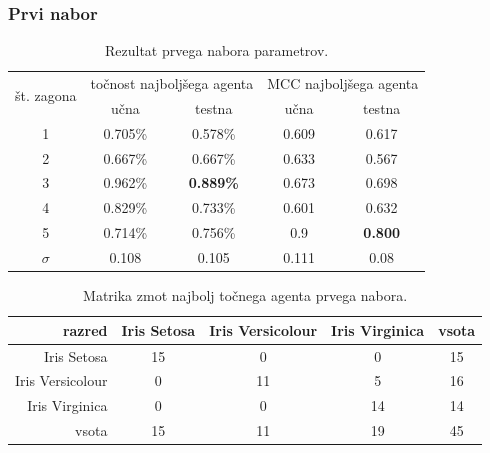 \subsubsection{Prvi nabor}
\begin{table}[H]
    \caption{Rezultat prvega nabora parametrov.}
    \begin{center}
        \begin{tabular}{|| c | c c || c c ||}
            \hline
            \multirow{2}{*}{št. zagona} & \multicolumn{2}{c||}{točnost najboljšega agenta} & \multicolumn{2}{c||}{MCC najboljšega agenta} \\ \cline{2-5}
            & učna    & testna           & učna  & testna         \\
            \hline
            1        & 0.705\% & 0.578\%          & 0.609 & 0.617          \\
            \hline
            2        & 0.667\% & 0.667\%          & 0.633 & 0.567          \\
            \hline
            3        & 0.962\% & \textbf{0.889\%} & 0.673 & 0.698          \\
            \hline
            4        & 0.829\% & 0.733\%          & 0.601 & 0.632          \\
            \hline
            5        & 0.714\% & 0.756\%          & 0.9   & \textbf{0.800} \\
            \hline
            $\sigma$ & 0.108   & 0.105            & 0.111 & 0.08           \\
            \hline
        \end{tabular}
    \end{center}
    \label{tab:iris_result_1}
\end{table}

\begin{table}[H]
    \centering
    \caption{Matrika zmot najbolj točnega agenta prvega nabora.}
    \begin{tabular}{||rcccc||}
        \hline
        razred           & Iris Setosa & Iris Versicolour & Iris Virginica & vsota \\ \hline
        Iris Setosa      & 15          & 0                & 0              & 15    \\ \hline
        Iris Versicolour & 0           & 11               & 5              & 16    \\ \hline
        Iris Virginica   & 0           & 0                & 14             & 14    \\ \hline
        vsota            & 15          & 11               & 19             & 45    \\ \hline
    \end{tabular}
    \label{tab:iris_acc_1}
\end{table}

